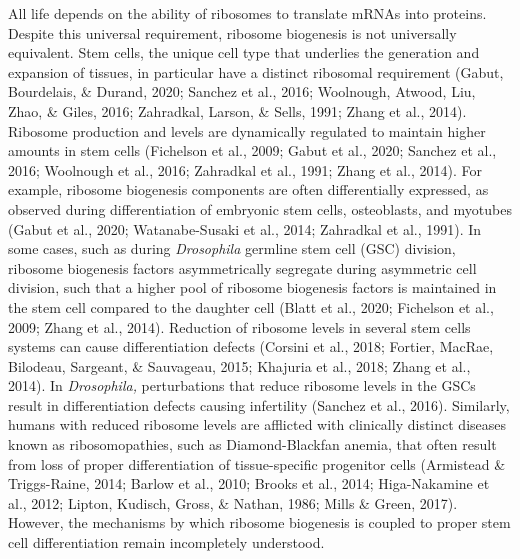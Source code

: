 \documentclass[12pt,oneside]{reedthesis}
\begin{document}
All life depends on the ability of ribosomes to translate mRNAs into
proteins. Despite this universal requirement, ribosome biogenesis is not
universally equivalent. Stem cells, the unique cell type that underlies
the generation and expansion of tissues, in particular have a distinct
ribosomal requirement (Gabut, Bourdelais, \& Durand, 2020; Sanchez et al., 2016; Woolnough, Atwood, Liu, Zhao, \& Giles, 2016; Zahradkal, Larson, \& Sells, 1991; Zhang et al., 2014). Ribosome
production and levels are dynamically regulated to maintain higher
amounts in stem cells (Fichelson et al., 2009; Gabut et al., 2020; Sanchez et al., 2016; Woolnough et al., 2016; Zahradkal et al., 1991; Zhang et al., 2014). For
example, ribosome biogenesis components are often differentially
expressed, as observed during differentiation of embryonic stem cells,
osteoblasts, and myotubes (Gabut et al., 2020; Watanabe-Susaki et al., 2014; Zahradkal et al., 1991). In
some cases, such as during \emph{Drosophila} germline stem cell (GSC)
division, ribosome biogenesis factors asymmetrically segregate during
asymmetric cell division, such that a higher pool of ribosome biogenesis
factors is maintained in the stem cell compared to the daughter cell
(Blatt et al., 2020; Fichelson et al., 2009; Zhang et al., 2014). Reduction of ribosome levels in several stem cells
systems can cause differentiation defects
(Corsini et al., 2018; Fortier, MacRae, Bilodeau, Sargeant, \& Sauvageau, 2015; Khajuria et al., 2018; Zhang et al., 2014). In \emph{Drosophila,} perturbations that reduce ribosome
levels in the GSCs result in differentiation defects causing infertility
(Sanchez et al., 2016). Similarly, humans with reduced ribosome levels are
afflicted with clinically distinct diseases known as ribosomopathies,
such as Diamond-Blackfan anemia, that often result from loss of proper
differentiation of tissue-specific progenitor cells (Armistead \& Triggs-Raine, 2014; Barlow et al., 2010; Brooks et al., 2014; Higa-Nakamine et al., 2012; Lipton, Kudisch, Gross, \& Nathan, 1986; Mills \& Green, 2017). However, the
mechanisms by which ribosome biogenesis is coupled to proper stem cell
differentiation remain incompletely understood.
\end{document}
